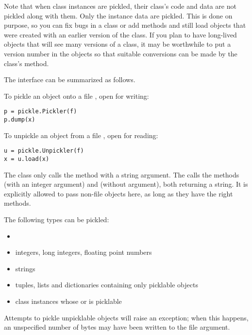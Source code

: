 Note that when class instances are pickled, their class's code and
data are not pickled along with them.  Only the instance data are
pickled.  This is done on purpose, so you can fix bugs in a class or
add methods and still load objects that were created with an earlier
version of the class.  If you plan to have long-lived objects that
will see many versions of a class, it may be worthwhile to put a version
number in the objects so that suitable conversions can be made by the
class's  method.

The interface can be summarized as follows.

To pickle an object  onto a file , open for writing:

\begin{verbatim}
p = pickle.Pickler(f)
p.dump(x)
\end{verbatim}

To unpickle an object  from a file , open for reading:

\begin{verbatim}
u = pickle.Unpickler(f)
x = u.load(x)
\end{verbatim}

The  class only calls the method  with a
string argument.  The  calls the methods 
(with an integer argument) and  (without argument),
both returning a string.  It is explicitly allowed to pass non-file
objects here, as long as they have the right methods.

The following types can be pickled:
\begin{itemize}

\item {}

\item integers, long integers, floating point numbers

\item strings

\item tuples, lists and dictionaries containing only picklable objects

\item class instances whose  or 
is picklable

\end{itemize}

Attempts to pickle unpicklable objects will raise an exception; when
this happens, an unspecified number of bytes may have been written to
the file argument.

